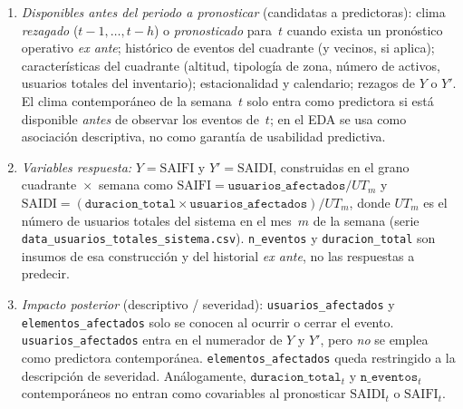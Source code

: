 \begin{enumerate}
    \item \textit{Disponibles antes del periodo a pronosticar} (candidatas a predictoras): clima \emph{rezagado} ($t-1,\ldots,t-h$) o \emph{pronosticado} para~$t$ cuando exista un pronóstico operativo \emph{ex ante}; histórico de eventos del cuadrante (y vecinos, si aplica); características del cuadrante (altitud, tipología de zona, número de activos, usuarios totales del inventario); estacionalidad y calendario; rezagos de $Y$ o $Y'$. El clima contemporáneo de la semana~$t$ solo entra como predictora si está disponible \emph{antes} de observar los eventos de~$t$; en el EDA se usa como asociación descriptiva, no como garantía de usabilidad predictiva.
    \item \textit{Variables respuesta:} $Y = \mathrm{SAIFI}$ y $Y' = \mathrm{SAIDI}$, construidas en el grano cuadrante~$\times$~semana como
    $\mathrm{SAIFI}=\texttt{usuarios\_afectados}/UT_{m}$ y
    $\mathrm{SAIDI}=(\texttt{duracion\_total}\times\texttt{usuarios\_afectados})/UT_{m}$,
    donde $UT_{m}$ es el número de usuarios totales del sistema en el mes~$m$ de la semana (serie \texttt{data\_usuarios\_totales\_sistema.csv}). \texttt{n\_eventos} y \texttt{duracion\_total} son insumos de esa construcción y del historial \emph{ex ante}, no las respuestas a predecir.
    \item \textit{Impacto posterior} (descriptivo / severidad): \texttt{usuarios\_afectados} y \texttt{elementos\_afectados} solo se conocen al ocurrir o cerrar el evento. \texttt{usuarios\_afectados} entra en el numerador de $Y$ y $Y'$, pero \textit{no} se emplea como predictora contemporánea. \texttt{elementos\_afectados} queda restringido a la descripción de severidad. Análogamente, $\texttt{duracion\_total}_t$ y $\texttt{n\_eventos}_t$ contemporáneos no entran como covariables al pronosticar $\mathrm{SAIDI}_t$ o $\mathrm{SAIFI}_t$.
\end{enumerate}

